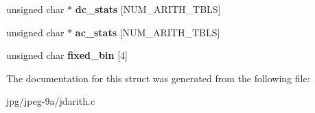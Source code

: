 \begin{DoxyCompactItemize}
\item 
\hypertarget{structarith__entropy__decoder_a0a8fd2a17e1e838e9194fab8579463d5}{unsigned char $\ast$ {\bfseries dc\+\_\+stats} \mbox{[}N\+U\+M\+\_\+\+A\+R\+I\+T\+H\+\_\+\+T\+B\+L\+S\mbox{]}}\label{structarith__entropy__decoder_a0a8fd2a17e1e838e9194fab8579463d5}

\item 
\hypertarget{structarith__entropy__decoder_ad24b1d5f8dae5839bca9cc749bf9f06e}{unsigned char $\ast$ {\bfseries ac\+\_\+stats} \mbox{[}N\+U\+M\+\_\+\+A\+R\+I\+T\+H\+\_\+\+T\+B\+L\+S\mbox{]}}\label{structarith__entropy__decoder_ad24b1d5f8dae5839bca9cc749bf9f06e}

\item 
\hypertarget{structarith__entropy__decoder_a3e88e1dc54dd33d41dd937a8dc03342a}{unsigned char {\bfseries fixed\+\_\+bin} \mbox{[}4\mbox{]}}\label{structarith__entropy__decoder_a3e88e1dc54dd33d41dd937a8dc03342a}

\end{DoxyCompactItemize}


The documentation for this struct was generated from the following file\+:\begin{DoxyCompactItemize}
\item 
jpg/jpeg-\/9a/jdarith.\+c\end{DoxyCompactItemize}
